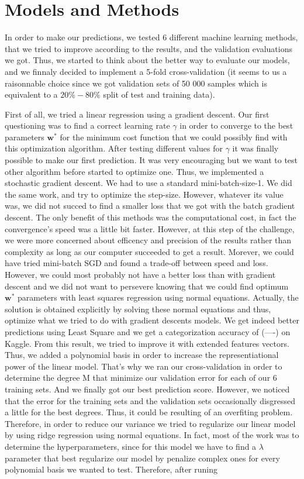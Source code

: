 \documentclass[10pt,conference,compsocconf]{IEEEtran}
\begin{document}
\section{Models and Methods}
\label{sec:structure-paper}

In order to make our predictions, we tested 6 different machine learning methods, that we tried to improve according to the results, and the validation evaluations we got. Thus, we started to think about the better way to evaluate our models, and we finnaly decided to implement a 5-fold cross-validation (it seems to us a raisonnable choice since we got validation sets of 50 000 samples which is equivalent to a $20\%-80\%$ split of test and training data). 

First of all, we tried a linear regression using a gradient descent. Our first questioning was to find a correct learning rate $\gamma$ in order to converge to the best parameters $\mathbf{w^*}$ for the minimum cost function that we could possibly find with this optimization algorithm. After testing different values for $\gamma$ it was finally possible to make our first prediction. It was very encouraging but we want to test other algorithm before started to optimize one. Thus, we implemented a stochastic gradient descent. We had to use a standard mini-batch-size-1. We did the same work, and try to optimize the step-size. However, whatever its value was, we did not succed to find a smaller loss that we got with the batch gradient descent. The only benefit of this methods was the computational cost, in fact the convergence's speed was a little bit faster. However, at this step of the challenge, we were more concerned about efficency and  precision of the results rather than complexity as long as our computer succeeded to get a result. Morever, we could have tried mini-batch SGD and found a trade-off between speed and loss. However, we could most probably not have a better loss than with gradient descent and we did not want to persevere knowing that we could find optimum $\mathbf{w^*}$ parameters with least squares regression using normal equations. Actually, the solution is obtained explicitly by solving these normal equations and thus, optimize what we tried to do with gradient descents models. We get indeed better predictions using Least Square and we get a categorization accuracy of (----) on Kaggle. From this result, we tried to improve it with extended features vectors. Thus, we added a polynomial basis in order to increase the representiational power of the linear model. That's why we ran our cross-validation in order to determine the degree M that minimize our validation error for each of our 6 training sets. And we finally got our best prediction score. However, we noticed that the error for the training sets and the validation sets occasionally disgressed a little for the best degrees. Thus, it could be resulting of an overfiting problem. Therefore, in order to reduce our variance we tried to regularize our linear model by using ridge regression using normal equations. In fact, most of the work was to determine the hyperparameters, since for this model we have to find a $\lambda$ parameter that best regularize our model by penalize complex ones for every polynomial basis we wanted to test. Therefore, after runing 
\end{document}
